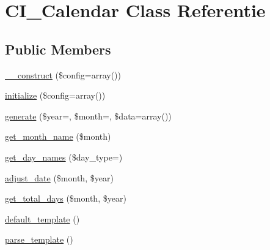 \hypertarget{class_c_i___calendar}{}\section{C\+I\+\_\+\+Calendar Class Referentie}
\label{class_c_i___calendar}
\subsection*{Public Members}
\begin{DoxyCompactItemize}
\item 
\mbox{\hyperlink{class_c_i___calendar_af7f9493844d2d66e924e3c1df51ce616}{\+\_\+\+\_\+construct}} (\$config=array())
\item 
\mbox{\hyperlink{class_c_i___calendar_a481385e36d920f5a5005ace05c6cd016}{initialize}} (\$config=array())
\item 
\mbox{\hyperlink{class_c_i___calendar_aabfc9d516a481b11230cd6562f6809f2}{generate}} (\$year=\textquotesingle{}\textquotesingle{}, \$month=\textquotesingle{}\textquotesingle{}, \$data=array())
\item 
\mbox{\hyperlink{class_c_i___calendar_a056208e620b0ffc2525a07d8646eb194}{get\+\_\+month\+\_\+name}} (\$month)
\item 
\mbox{\hyperlink{class_c_i___calendar_a31e09ae5dac8a808676ebddab1e735cc}{get\+\_\+day\+\_\+names}} (\$day\+\_\+type=\textquotesingle{}\textquotesingle{})
\item 
\mbox{\hyperlink{class_c_i___calendar_ac216356ab0ff31e8538fd9208a26577a}{adjust\+\_\+date}} (\$month, \$year)
\item 
\mbox{\hyperlink{class_c_i___calendar_a3c863f62907e445af2711df11fb90ff9}{get\+\_\+total\+\_\+days}} (\$month, \$year)
\item 
\mbox{\hyperlink{class_c_i___calendar_a5d174710ed7a2a08df21dbaa2bb6a50f}{default\+\_\+template}} ()
\item 
\mbox{\hyperlink{class_c_i___calendar_ac0331959620d18320ab6587621730d44}{parse\+\_\+template}} ()
\end{DoxyCompactItemize}

